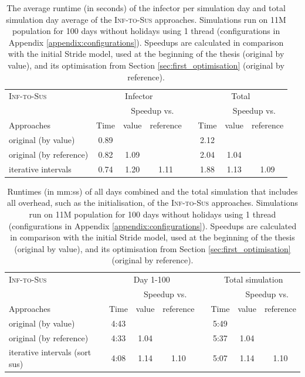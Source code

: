 \begin{table}
    \centering
    \begin{tabular}{lccclccc}
        \hline
        \textsc{Inf-to-Sus} & \multicolumn{3}{c}{Infector} &  & \multicolumn{3}{c}{Total} \\ \cline{2-4} \cline{6-8} 
         &  & \multicolumn{2}{c}{Speedup vs.} &  &  & \multicolumn{2}{c}{Speedup vs.} \\ \cline{3-4} \cline{7-8} 
        Approaches & Time & value & reference &  & Time & value & reference \\ \hline
        original (by value) & 0.89 &  &  &  & 2.12 &  &  \\
        original (by reference) & 0.82 & 1.09 &  &  & 2.04 & 1.04 &  \\
        iterative intervals & 0.74 & 1.20 & 1.11 &  & 1.88 & 1.13 & 1.09 \\ \hline
    \end{tabular}
    \caption{The average runtime (in seconds) of the infector per simulation day and total simulation day average of the \textsc{Inf-to-Sus} approaches. Simulations run on 11M population for 100 days without holidays using 1 thread (configurations in Appendix \ref{appendix:configurations}). Speedups are calculated in comparison with the initial Stride model, used at the beginning of the thesis (original by value), and its optimisation from Section \ref{sec:first_optimisation} (original by reference).}
    \label{tab:all_infector_and_totals_inf-to-sus}
\end{table}

\begin{table}
    \centering
    \begin{tabular}{lccccccc}
        \hline
        \textsc{Inf-to-Sus} & \multicolumn{3}{c}{Day 1-100} &  & \multicolumn{3}{c}{Total simulation} \\ \cline{2-4} \cline{6-8} 
         &  & \multicolumn{2}{c}{Speedup vs.} &  &  & \multicolumn{2}{c}{Speedup vs.} \\ \cline{3-4} \cline{7-8} 
        Approaches & Time & value & reference &  & Time & value & reference \\ \hline
        original (by value) & 4:43 &  &  &  & 5:49 &  &  \\
        original (by reference) & 4:33 & 1.04 &  &  & 5:37 & 1.04 &  \\
        iterative intervals (sort sus) & 4:08 & 1.14 & 1.10 &  & 5:07 & 1.14 & 1.10 \\ \hline
    \end{tabular}
    \caption{Runtimes (in mm:ss) of all days combined and the total simulation that includes all overhead, such as the initialisation, of the \textsc{Inf-to-Sus} approaches. Simulations run on 11M population for 100 days without holidays using 1 thread (configurations in Appendix \ref{appendix:configurations}). Speedups are calculated in comparison with the initial Stride model, used at the beginning of the thesis (original by value), and its optimisation from Section \ref{sec:first_optimisation} (original by reference).}
    \label{tab:all_simulation_times_inf-to-sus}
\end{table}